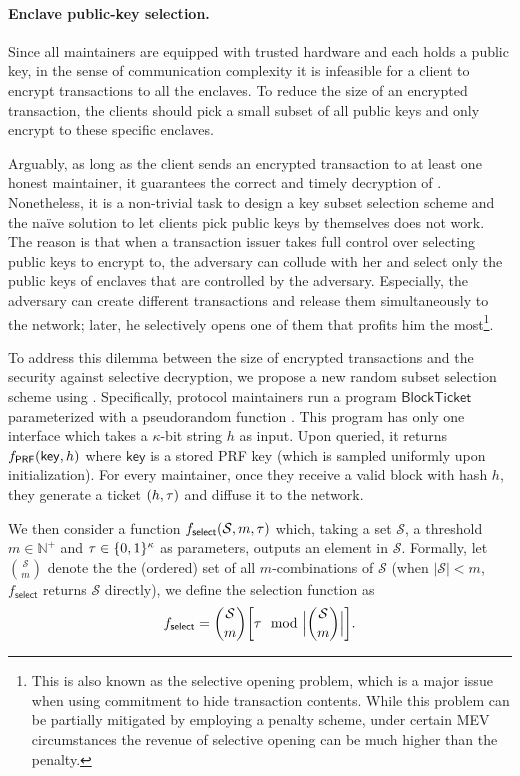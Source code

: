 \paragraph{Enclave public-key selection.}
%
Since all maintainers are equipped with trusted hardware and each holds a public key, in the sense of communication complexity it is infeasible for a client to encrypt transactions to all the enclaves.
%
To reduce the size of an encrypted transaction, the clients should pick a small subset of all public keys and only encrypt to these specific enclaves.

Arguably, as long as the client sends an encrypted transaction \tx to at least one honest maintainer, it guarantees the correct and timely decryption of \tx.
%
Nonetheless, it is a non-trivial task to design a key subset selection scheme and the na\"ive solution to let clients pick public keys by themselves does not work.
%
The reason is that when a transaction issuer takes full control over selecting public keys to encrypt to, the adversary can collude with her and select only the public keys of enclaves that are controlled by the adversary.
%
Especially, the adversary can create different transactions and release them simultaneously to the network; later, he selectively opens one of them that profits him the most\footnote{This is also known as the selective opening problem, which is a major issue when using commitment to hide transaction contents. While this problem can be partially mitigated by employing a penalty scheme, under certain MEV circumstances the revenue of selective opening can be much higher than the penalty.}.

To address this dilemma between the size of encrypted transactions and the security against selective decryption, we propose a new random subset selection scheme using \funcEnclave.
%
Specifically, protocol maintainers run a program $\mathsf{BlockTicket}$ parameterized with a pseudorandom function \fPRF.
%
This program has only one interface which takes a $\kappa$-bit string $h$ as input.
%
Upon queried, it returns $f_\mathsf{PRF}(\mathsf{key}, h)$ where $\mathsf{key}$ is a stored PRF key (which is sampled uniformly upon initialization).
%
For every maintainer, once they receive a valid block \block with hash $h$, they generate a ticket $(h, \mathsf{\tau})$ and diffuse it to the network.



We then consider a function $f_{\mathsf{select}}(\mathcal{S}, m, \mathsf{\tau})$ which, taking a set $\mathcal{S}$, a threshold $m \in \mathbb{N}^+$ and $\mathsf{\tau} \in \{0, 1\}^\kappa$ as parameters, outputs an element in $\mathcal{S}$.
%
Formally, let $\binom{\mathcal{S}}{m}$ denote the the (ordered) set of all $m$-combinations of $\mathcal{S}$ (when $|\mathcal{S}| < m$, $f_{\mathsf{select}} $ returns $\mathcal{S}$ directly), we define the selection function as
%
\begin{equation*}
	f_{\mathsf{select}} = \binom{\mathcal{S}}{m} \bigg[\mathsf{\tau} \mod \Big|\binom{\mathcal{S}}{m} \Big| \bigg].
\end{equation*}

